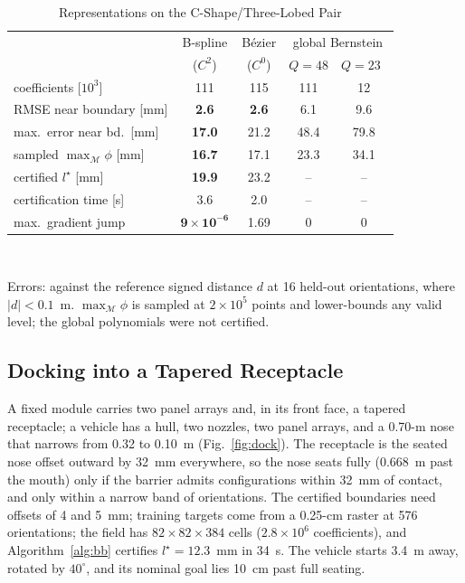 \documentclass[journal]{IEEEtran}
\theoremstyle{definition}
\newcommand{\Mset}{\mathcal{M}}
\begin{document}
\begin{table}[t]
\caption{Representations on the C-Shape/Three-Lobed Pair}
\label{tab:repr}
\centering
\footnotesize
\setlength{\tabcolsep}{2.5pt}
\renewcommand{\arraystretch}{1.05}
\begin{tabular}{lcccc}
\toprule
& B-spline & B\'ezier & \multicolumn{2}{c}{global Bernstein}\\
& ($C^2$) & ($C^0$) & $Q{=}48$ & $Q{=}23$~\cite{jo2026geometry}\\
\midrule
coefficients [$10^3$] & 111 & 115 & 111 & 12\\
RMSE near boundary [mm] & \textbf{2.6} & \textbf{2.6} & 6.1 & 9.6\\
max.\ error near bd.\ [mm] & \textbf{17.0} & 21.2 & 48.4 & 79.8\\
sampled $\max_{\Mset}\phi$ [mm] & \textbf{16.7} & 17.1 & 23.3 & 34.1\\
certified $l^\star$ [mm] & \textbf{19.9} & 23.2 & -- & --\\
certification time [s] & 3.6 & 2.0 & -- & --\\
max.\ gradient jump & $\mathbf{9{\times}10^{-6}}$ & 1.69 & 0 & 0\\
\bottomrule
\end{tabular}
\\[3pt]
\parbox{\columnwidth}{\footnotesize Errors: against the reference signed distance $d$ at 16 held-out
orientations, where $|d|<0.1$~m.
$\max_{\Mset}\phi$ is sampled at $2\times10^5$ points and lower-bounds any valid level; the global
polynomials were not certified.}
\end{table}

\subsection{Docking into a Tapered Receptacle}\label{sec:exp-dock}
A fixed module carries two panel arrays and, in its front face, a tapered receptacle; a vehicle
has a hull, two nozzles, two panel arrays, and a 0.70-m nose that narrows from 0.32 to 0.10~m
(Fig.~\ref{fig:dock}). The receptacle is the seated nose offset outward by 32~mm everywhere, so the
nose seats fully (0.668~m past the mouth) only if the barrier admits configurations within 32~mm of
contact, and only within a narrow band of orientations. The certified boundaries need offsets of 4
and 5~mm; training targets come from a 0.25-cm raster at 576 orientations; the field has
$82\times82\times384$ cells ($2.8\times10^6$ coefficients), and Algorithm~\ref{alg:bb} certifies
$l^\star=12.3$~mm in 34~s. The vehicle starts 3.4~m away, rotated by $40^\circ$, and its nominal
goal lies 10~cm past full seating.
\end{document}
